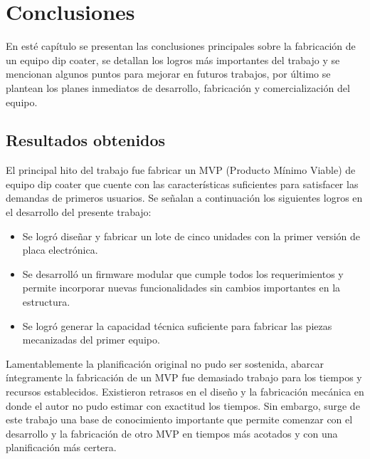 
\chapter{Conclusiones} %

\label{Chapter5} %



En esté capítulo se presentan las conclusiones principales sobre la fabricación de un equipo dip coater, se detallan los logros más importantes del trabajo y se mencionan algunos puntos para mejorar en futuros trabajos, por último se plantean los planes inmediatos de desarrollo, fabricación y comercialización del equipo.

\section{Resultados obtenidos }


El principal hito del trabajo fue fabricar un MVP (Producto Mínimo Viable) de equipo dip coater que cuente con las características suficientes para satisfacer las demandas de primeros usuarios. 
Se señalan a continuación los siguientes logros en el desarrollo del presente trabajo: 
\begin{itemize}
\item Se logró diseñar y fabricar un lote de cinco unidades con la primer versión de placa electrónica.
\item Se desarrolló un firmware modular que cumple todos los requerimientos y permite incorporar nuevas funcionalidades sin cambios importantes en la estructura.
\item Se logró generar la capacidad técnica suficiente para fabricar las piezas mecanizadas del primer equipo.  
\end{itemize} 
 


Lamentablemente la planificación original no pudo ser sostenida, abarcar íntegramente la fabricación de un MVP fue demasiado trabajo para los tiempos y recursos establecidos. Existieron retrasos en el diseño y la fabricación mecánica en donde el autor no pudo estimar con exactitud los tiempos. Sin embargo, surge de este trabajo una base de conocimiento importante que permite comenzar con el desarrollo y la fabricación de otro MVP en tiempos más acotados y con una planificación más certera. 


